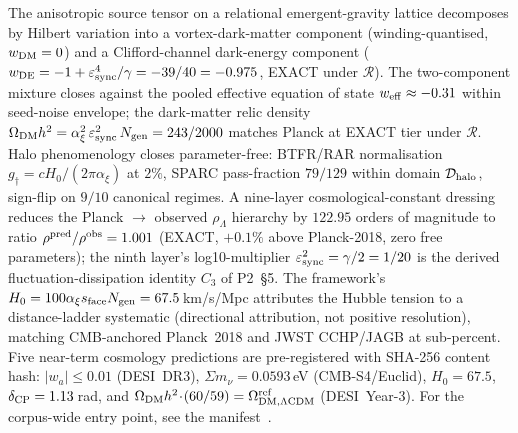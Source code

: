 
The anisotropic source tensor on a relational emergent-gravity
lattice decomposes by Hilbert variation into a vortex-dark-matter
component (winding-quantised, $w_{\rm DM}=0$) and a Clifford-channel
dark-energy component ($w_{\rm DE}=-1+\varepsilon_{\rm sync}^{4}/\gamma
=-39/40=-0.975$, EXACT under $\mathcal R$). The two-component
mixture closes against the pooled effective equation of state
$w_{\rm eff}\approx-0.31$ within seed-noise envelope; the dark-matter
relic density $\Omega_{\rm DM}h^{2}=\alpha_{\xi}^{2}\,\varepsilon_{\rm sync}^{2}\,
N_{\rm gen}=243/2000$ matches Planck at EXACT tier under $\mathcal R$.
Halo phenomenology closes parameter-free: BTFR/RAR normalisation
$g_{\dagger}=cH_{0}/(2\pi\alpha_{\xi})$ at $2\%$, SPARC pass-fraction
$79/129$ within domain $\mathcal D_{\rm halo}$, sign-flip on $9/10$
canonical regimes. A nine-layer cosmological-constant dressing
reduces the Planck $\to$ observed $\rho_{\Lambda}$ hierarchy by
$122.95$ orders of magnitude to ratio $\rho^{\rm pred}/\rho^{\rm obs}
=1.001$ (EXACT, $+0.1\%$ above Planck-2018, zero free parameters);
the ninth layer's log10-multiplier $\varepsilon_{\rm sync}^{2}=\gamma/2
=1/20$ is the derived fluctuation-dissipation identity $C_{3}$ of
P2~\S5. The framework's $H_{0}=100\alpha_{\xi}s_{\rm face}N_{\rm gen}
=67.5$\,km/s/Mpc attributes the Hubble tension to a
distance-ladder systematic (directional attribution, not
positive resolution), matching CMB-anchored Planck~2018 and
JWST CCHP/JAGB at sub-percent. Five near-term cosmology predictions
are pre-registered with SHA-256 content hash:
$|w_{a}|\le 0.01$ (DESI~DR3), $\Sigma m_{\nu}=0.0593$\,eV
(CMB-S4/Euclid), $H_{0}=67.5$, $\delta_{\rm CP}=1.13$\,rad, and
$\Omega_{\rm DM}h^{2}\!\cdot\!(60/59)=\Omega_{\rm DM,\Lambda CDM}^{\rm ref}$
(DESI~Year-3). For the corpus-wide entry point, see the
manifest~\cite{Paper0}.
